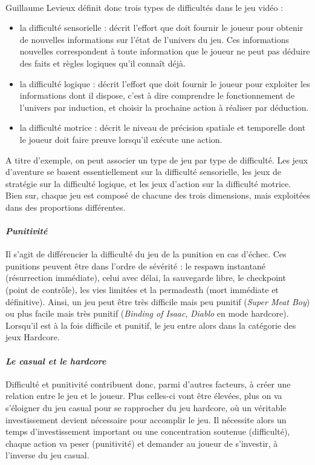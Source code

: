 \paragraph{}Guillaume Levieux \cite{Levi11} définit donc trois types de difficultés dans le jeu vidéo :
	\begin{itemize}
		\item la difficulté sensorielle : décrit l’effort que doit fournir le joueur pour obtenir de nouvelles informations sur l’état de l’univers du jeu. Ces informations nouvelles correspondent à toute information que le joueur ne peut pas déduire des faits et règles logiques qu’il connaît déjà.
		\item la difficulté logique : décrit l’effort que doit fournir le joueur pour exploiter les informations dont il dispose, c’est à dire comprendre le fonctionnement de l’univers par induction, et choisir la prochaine action à réaliser par déduction.
		\item la difficulté motrice : décrit le niveau de précision spatiale et temporelle dont le joueur doit faire preuve lorsqu’il exécute une action.
\end{itemize}
A titre d’exemple, on peut associer un type de jeu par type de difficulté. Les jeux d’aventure se basent essentiellement sur la difficulté sensorielle, les jeux de stratégie sur la difficulté logique, et les jeux d’action sur la difficulté motrice. Bien sur, chaque jeu est composé de chacune des trois dimensions, mais exploitées dans des proportions différentes.
		
		\paragraph{\emph{Punitivité}\\ \quad}
Il s’agit de différencier la difficulté du jeu de la punition en cas d’échec. Ces punitions peuvent être dans l’ordre de sévérité : le respawn instantané (résurrection immédiate), celui avec délai, la sauvegarde libre, le checkpoint (point de contrôle), les vies limitées et la permadeath (mort immédiate et définitive). Ainsi, un jeu peut être très difficile mais peu punitif (\emph{Super Meat Boy}) ou plus facile mais très punitif (\emph{Binding of Isaac}, \emph{Diablo} en mode hardcore). Lorsqu’il est à la fois difficile et punitif, le jeu entre alors dans la catégorie des jeux Hardcore.

		\paragraph{\emph{Le casual et le hardcore}\\ \quad}
Difficulté et punitivité contribuent donc, parmi d’autres facteurs, à créer une relation entre le jeu et le joueur. Plus celles-ci vont être élevées, plus on va s’éloigner du jeu casual pour se rapprocher du jeu hardcore, où un véritable investissement devient nécessaire pour accomplir le jeu. Il nécessite alors un temps d’investissement important ou une concentration soutenue (difficulté), chaque action va peser (punitivité) et demander au joueur de s’investir, à l’inverse du jeu casual.		
		
